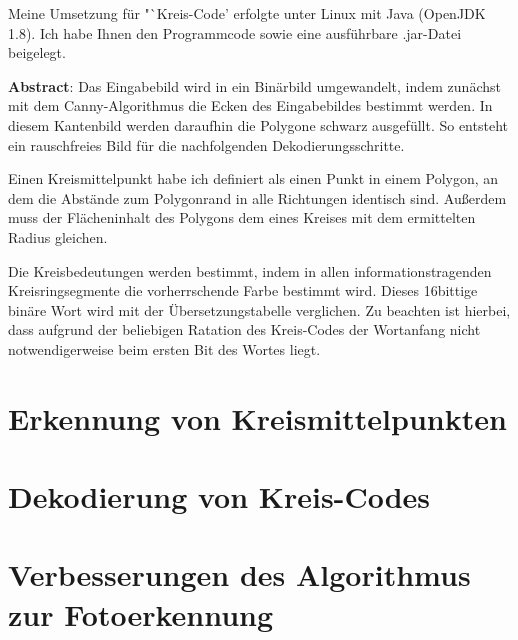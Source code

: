\documentclass[a4paper, DIV=12, firstfoot=false, dvipsnames]{scrreprt}
\newcommand{\task}[1]{Kreis-Code}
\begin{document}
	\titlehead{Teilnahme 6745 (Team 00001) \hfill Laurenz Grote}
	\title{\task}
	\subtitle{Aufgabe 3}
	\author{Laurenz Friedrich Grote}
	\date{}
	\maketitle
	\tableofcontents
	\vspace {2em}
	Meine Umsetzung für "`\task"' erfolgte unter Linux mit Java (OpenJDK 1.8). Ich habe Ihnen den Programmcode sowie eine ausführbare .jar-Datei beigelegt.
	
	\vfill{}
	\textbf{Abstract}:
	Das Eingabebild wird in ein Binärbild umgewandelt, indem zunächst mit dem Canny-Algorithmus die Ecken des Eingabebildes bestimmt werden. In diesem Kantenbild werden daraufhin die Polygone schwarz ausgefüllt. So entsteht ein rauschfreies Bild für die nachfolgenden Dekodierungsschritte.

	Einen Kreismittelpunkt habe ich definiert als einen Punkt in einem Polygon, an dem die Abstände zum Polygonrand in alle Richtungen identisch sind. Außerdem muss der Flächeninhalt des Polygons dem eines Kreises mit dem ermittelten Radius gleichen.

	Die Kreisbedeutungen werden bestimmt, indem in allen informationstragenden Kreisringsegmente die vorherrschende Farbe bestimmt wird. Dieses 16bittige binäre Wort wird mit der Übersetzungstabelle verglichen. Zu beachten ist hierbei, dass aufgrund der beliebigen Ratation des \task{}s der Wortanfang nicht notwendigerweise beim ersten Bit des Wortes liegt.

	\pagebreak
	\chapter{Erkennung von Kreismittelpunkten}
		
	\chapter{Dekodierung von Kreis-Codes}
		
	\chapter{Verbesserungen des Algorithmus zur Fotoerkennung}
		
\end{document}
